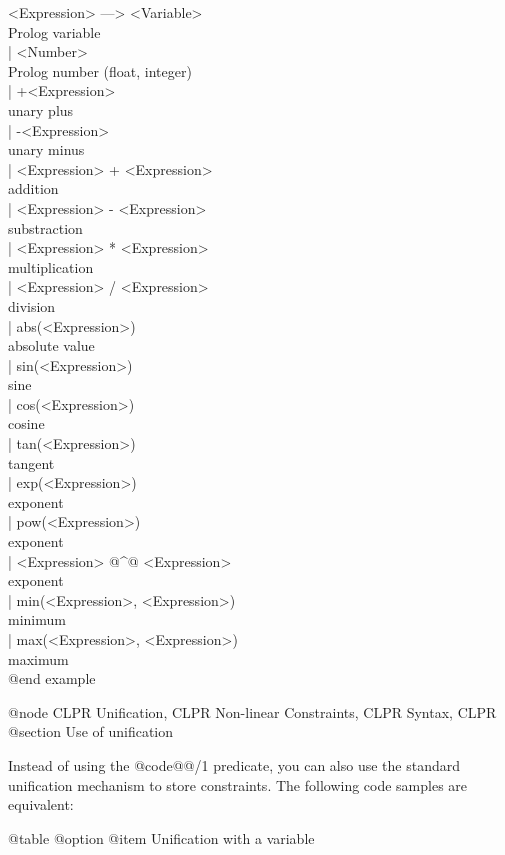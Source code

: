 <Expression> --->  <Variable>				\\ Prolog variable \\
	     | <Number>				\\ Prolog number (float, integer) \\
	     | +<Expression>				\\ unary plus \\
	     | -<Expression>				\\ unary minus \\
	     | <Expression> + <Expression>		\\ addition \\
	     | <Expression> - <Expression>		\\ substraction \\
	     | <Expression> * <Expression>		\\ multiplication \\
	     | <Expression> / <Expression>		\\ division \\
	     | abs(<Expression>)			\\ absolute value \\
	     | sin(<Expression>)			\\ sine \\
	     | cos(<Expression>)			\\ cosine \\
	     | tan(<Expression>)			\\ tangent \\
	     | exp(<Expression>)			\\ exponent \\
	     | pow(<Expression>)			\\ exponent \\
	     | <Expression> @{^@} <Expression>		\\ exponent \\
	     | min(<Expression>, <Expression>)	\\ minimum \\
	     | max(<Expression>, <Expression>)	\\ maximum \\
@end example

@node CLPR Unification, CLPR Non-linear Constraints, CLPR Syntax, CLPR
@section Use of unification

Instead of using the @code{@{@}/1} predicate, you can also use the standard
unification mechanism to store constraints. The following code samples
are equivalent:

@table @option
@item Unification with a variable

